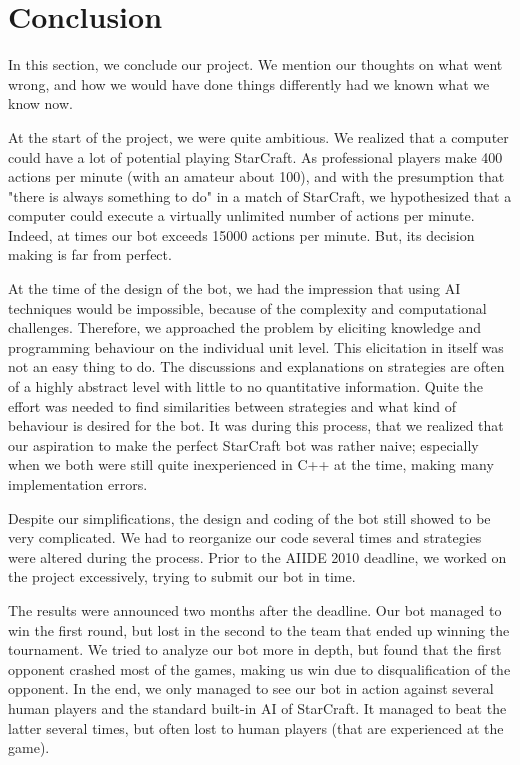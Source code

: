 
\chapter{Conclusion}
\label{chap:conclusion}

In this section, we conclude our project. We mention our thoughts on what went wrong, and how we would have done things differently had we known what we know now.

At the start of the project, we were quite ambitious. We realized that a computer could have a lot of potential playing StarCraft. As professional players make 400 actions per minute (with an amateur about 100), and with the presumption that "there is always something to do" in a match of StarCraft, we hypothesized that a computer could execute a virtually unlimited number of actions per minute. Indeed, at times our bot exceeds 15000 actions per minute. But, its decision making is far from perfect. 

At the time of the design of the bot, we had the impression that using AI techniques would be impossible, because of the complexity and computational challenges. Therefore, we approached the problem by eliciting knowledge and programming behaviour on the individual unit level. This elicitation in itself was not an easy thing to do. The discussions and explanations on strategies are often of a highly abstract level with little to no quantitative information. Quite the effort was needed to find similarities between strategies and what kind of behaviour is desired for the bot. It was during this process, that we realized that our aspiration to make the perfect StarCraft bot was rather naive; especially when we both were still quite inexperienced in C++ at the time, making many implementation errors.

Despite our simplifications, the design and coding of the bot still showed to be very complicated. We had to reorganize our code several times and strategies were altered during the process. Prior to the AIIDE 2010 deadline, we worked on the project excessively, trying to submit our bot in time.

The results were announced two months after the deadline. Our bot managed to win the first round, but lost in the second to the team that ended up winning the tournament. We tried to analyze our bot more in depth, but found that the first opponent crashed most of the games, making us win due to disqualification of the opponent. In the end, we only managed to see our bot in action against several human players and the standard built-in AI of StarCraft. It managed to beat the latter several times, but often lost to human players (that are experienced at the game).


